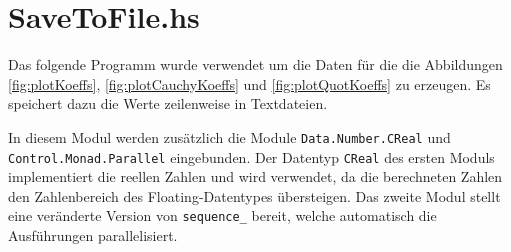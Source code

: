 \begin{comment}
\begin{align*}
v(t)&=
  \frac{1}{2}t^{-1}+
  \frac{3}{4}it^{0}+
  \frac{3}{2}t^{1}+
  \frac{-63}{16}it^{2}+
  \frac{-27}{2}t^{3}+
  \frac{1899}{32}it^{4}+
  \frac{324}{1}t^{5}+
  \frac{-543483}{256}it^{6}+
\\&\qquad\frac{-32427}{2}t^{7}+
  \frac{72251109}{512}it^{8}+
  \frac{2752623}{2}t^{9}+
  \frac{-30413055339}{2048}it^{10}+
  \frac{-175490226}{1}t^{11}+
\\&\qquad\frac{9228545313147}{4096}it^{12}+
  \frac{31217145174}{1}t^{13}+
  \frac{-30419533530730323}{65536}it^{14}+
\\&\qquad\frac{-14741904895227}{2}t^{15}+
  \frac{16317191917079376129}{131072}it^{16}+
  \frac{4456057685561073}{2}t^{17}+
\\&\qquad\frac{-22082325223708363779009}{524288}it^{18}+
  \frac{-1677161966915352627}{2}t^{19}+
\\&\qquad\frac{18391039987731669876160557}{1048576}it^{20}+
  \frac{384452768592440499024}{1}t^{21}+
\\&\qquad\frac{-73930258776609869550094166319}{8388608}it^{22}+
  \frac{-210878717949731493002826}{1}t^{23}+
\\&\qquad\frac{88204980719873920964105544038937}{16777216}it^{24}+
  \frac{136346686011011135869054074}{1}t^{25}+
\\&\qquad\frac{-246474684300724210330466557670749827}{67108864}it^{26}+
\\&\qquad\frac{-102614997677451303311734530276}{1}t^{27}+
\\&\qquad\frac{398608966820777951112056743321778108571}{134217728}it^{28}+
\\&\qquad\frac{88929857099067937229443324337874}{1}t^{29}+
\\&\qquad\frac{-11819876688678190917510659802435441505814403}{4294967296}it^{30}+
  \dots
\end{align*}
\end{comment}

\section{SaveToFile.hs} \label{sec:SaveToFile.hs}
Das folgende Programm wurde verwendet um die Daten für die die Abbildungen
\ref{fig:plotKoeffs}, \ref{fig:plotCauchyKoeffs} und \ref{fig:plotQuotKoeffs}
zu erzeugen. Es speichert dazu die Werte zeilenweise in Textdateien.

In diesem Modul werden zusätzlich die Module \texttt{Data.Number.CReal} und
\texttt{Control.Monad.Parallel} eingebunden.
Der Datentyp \texttt{CReal} des ersten Moduls implementiert die reellen Zahlen
und wird verwendet, da die berechneten Zahlen den Zahlenbereich des
Floating-Datentypes übersteigen.  Das zweite Modul stellt eine veränderte
Version von \texttt{sequence\_} bereit, welche automatisch die Ausführungen
parallelisiert.

